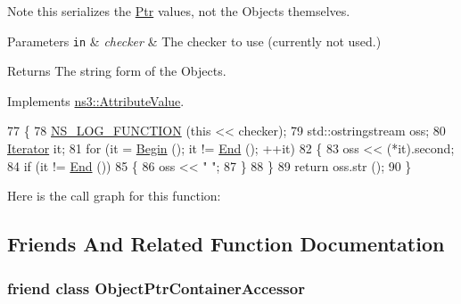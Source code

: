 Note this serializes the \hyperlink{classns3_1_1Ptr}{Ptr} values, not the Objects themselves.


\begin{DoxyParams}[1]{Parameters}
\mbox{\tt in}  & {\em checker} & The checker to use (currently not used.) \\
\hline
\end{DoxyParams}
\begin{DoxyReturn}{Returns}
The string form of the Objects. 
\end{DoxyReturn}


Implements \hyperlink{classns3_1_1AttributeValue_ace4b3a4e96ab0c46e0fdff15ed968fb1}{ns3\+::\+Attribute\+Value}.


\begin{DoxyCode}
77 \{
78   \hyperlink{log-macros-disabled_8h_a90b90d5bad1f39cb1b64923ea94c0761}{NS\_LOG\_FUNCTION} (\textcolor{keyword}{this} << checker);
79   std::ostringstream oss;
80   \hyperlink{classns3_1_1ObjectPtrContainerValue_a1f0661f9cf3626d62a4623f36b672876}{Iterator} it;
81   \textcolor{keywordflow}{for} (it = \hyperlink{classns3_1_1ObjectPtrContainerValue_a2dd05c2e7483eb2eeeb0b2389f238815}{Begin} (); it != \hyperlink{classns3_1_1ObjectPtrContainerValue_a45b7448cf99d2629260c21f740b904d0}{End} (); ++it)
82     \{
83       oss << (*it).second;
84       \textcolor{keywordflow}{if} (it != \hyperlink{classns3_1_1ObjectPtrContainerValue_a45b7448cf99d2629260c21f740b904d0}{End} ())
85         \{
86           oss << \textcolor{stringliteral}{" "};
87         \}
88     \}
89   \textcolor{keywordflow}{return} oss.str ();
90 \}
\end{DoxyCode}


Here is the call graph for this function\+:




\subsection{Friends And Related Function Documentation}
\subsubsection[{\texorpdfstring{Object\+Ptr\+Container\+Accessor}{ObjectPtrContainerAccessor}}]{\setlength{\rightskip}{0pt plus 5cm}friend class {\bf Object\+Ptr\+Container\+Accessor}\hspace{0.3cm}{\ttfamily [friend]}}\hypertarget{classns3_1_1ObjectPtrContainerValue_a50531b6c792ec039bad8a2ea5a92deb8}{}\label{classns3_1_1ObjectPtrContainerValue_a50531b6c792ec039bad8a2ea5a92deb8}


